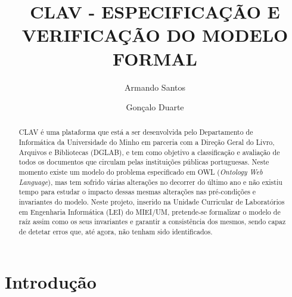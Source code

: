 \documentclass[runningheads,a4paper]{llncs}
\begin{document}
%
\title{CLAV - ESPECIFICAÇÃO E VERIFICAÇÃO DO MODELO FORMAL}
%
%
\author{Armando Santos \and
Gonçalo Duarte}

%
%
%
\maketitle              %
%
\begin{abstract}

CLAV é uma plataforma que está a ser desenvolvida pelo Departamento de Informática da Universidade do Minho em parceria com a Direção Geral do Livro, Arquivos e Bibliotecas (DGLAB), e tem como objetivo a classificação e avaliação de todos os documentos que circulam pelas instituições públicas portuguesas. Neste momento existe um modelo do problema especificado em OWL (\textit{Ontology Web Language}), mas tem sofrido várias alterações no decorrer do último ano e não existiu tempo para estudar o impacto dessas mesmas alterações nas pré-condições e invariantes do modelo. Neste projeto, inserido na Unidade Curricular de Laboratórios em Engenharia Informática (LEI) do MIEI/UM, pretende-se formalizar o modelo de raíz assim como os seus invariantes e garantir a consistência dos mesmos, sendo capaz de detetar erros que, até agora, não tenham sido identificados.

\end{abstract}
%
%
%
\section{Introdução}
\end{document}
